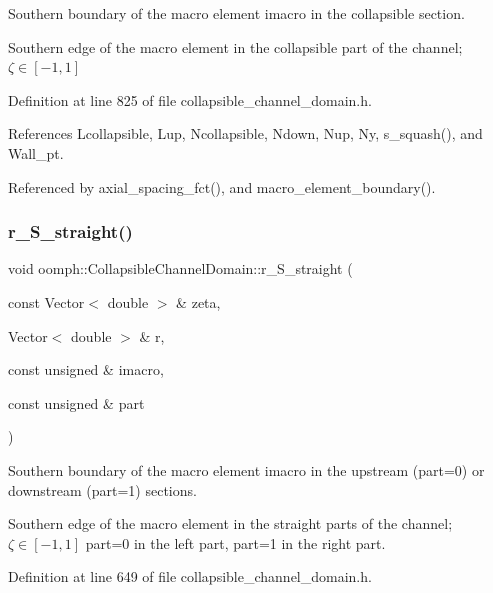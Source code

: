 Southern boundary of the macro element imacro in the collapsible section. 

Southern edge of the macro element in the collapsible part of the channel; $ \zeta \in [-1,1] $ 

Definition at line 825 of file collapsible\+\_\+channel\+\_\+domain.\+h.



References Lcollapsible, Lup, Ncollapsible, Ndown, Nup, Ny, s\+\_\+squash(), and Wall\+\_\+pt.



Referenced by axial\+\_\+spacing\+\_\+fct(), and macro\+\_\+element\+\_\+boundary().

\mbox{\label{classoomph_1_1CollapsibleChannelDomain_a12b9fbd546a2375fea2461a07b5db089}} 
\subsubsection{\texorpdfstring{r\+\_\+\+S\+\_\+straight()}{r\_S\_straight()}}
{\footnotesize\ttfamily void oomph\+::\+Collapsible\+Channel\+Domain\+::r\+\_\+\+S\+\_\+straight (\begin{DoxyParamCaption}\item[{const Vector$<$ double $>$ \&}]{zeta,  }\item[{Vector$<$ double $>$ \&}]{r,  }\item[{const unsigned \&}]{imacro,  }\item[{const unsigned \&}]{part }\end{DoxyParamCaption})\hspace{0.3cm}{\ttfamily [private]}}



Southern boundary of the macro element imacro in the upstream (part=0) or downstream (part=1) sections. 

Southern edge of the macro element in the straight parts of the channel; $ \zeta \in [-1,1] $ part=0 in the left part, part=1 in the right part. 

Definition at line 649 of file collapsible\+\_\+channel\+\_\+domain.\+h.



